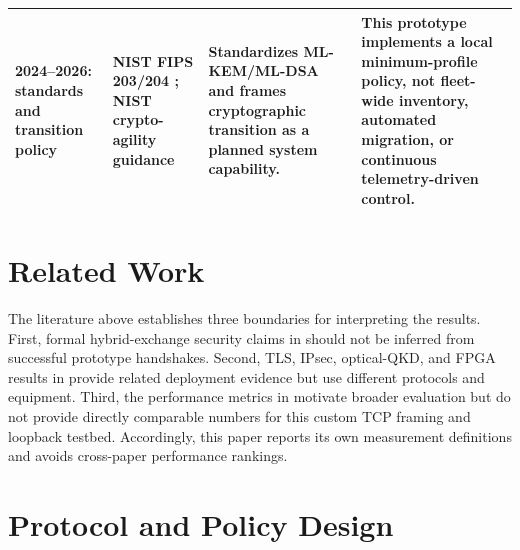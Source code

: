 \documentclass[journal]{IEEEtran}
\begin{document}
\begin{table}[t]
\begin{tabular}{p{}p{}p{}p{}}
2024--2026: standards and transition policy & NIST FIPS 203/204 \cite{nist203,nist204}; NIST crypto-agility guidance \cite{nistAgility} & Standardizes ML-KEM/ML-DSA and frames cryptographic transition as a planned system capability. & This prototype implements a local minimum-profile policy, not fleet-wide inventory, automated migration, or continuous telemetry-driven control. \\
\bottomrule
\end{tabular}
\end{table}

\section{Related Work}
The literature above establishes three boundaries for interpreting the results. First, formal hybrid-exchange security claims in \cite{dowling2020,bruckner2023} should not be inferred from successful prototype handshakes. Second, TLS, IPsec, optical-QKD, and FPGA results in \cite{rubio2024tls,rubio2024ofc,ricci2024,rubio2025} provide related deployment evidence but use different protocols and equipment. Third, the performance metrics in \cite{kampanakis2024,zheng2024,souvatzidaki2025} motivate broader evaluation but do not provide directly comparable numbers for this custom TCP framing and loopback testbed. Accordingly, this paper reports its own measurement definitions and avoids cross-paper performance rankings.

\section{Protocol and Policy Design}
\end{document}
